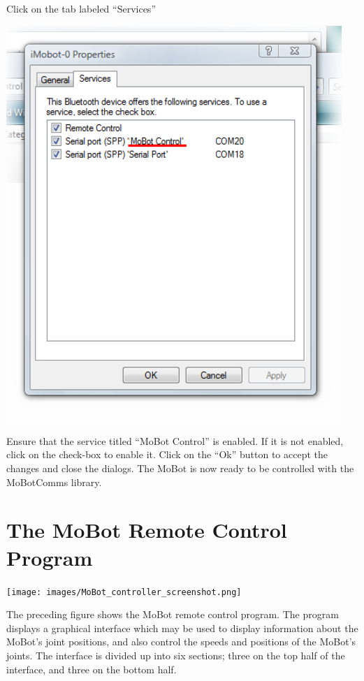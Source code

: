 \documentclass{article}
\begin{document}
Click on the tab labeled ``Services''

\begin{center}
\includegraphics[width=5in]{images/imobot_connect_8.png}
\end{center}

Ensure that the service titled ``MoBot Control'' is enabled. If it is not
enabled, click on the check-box to enable it. Click on the ``Ok'' button to
accept the changes and close the dialogs. The MoBot is now ready to be
controlled with the MoBotComms library.

\section{ The MoBot Remote Control Program }
\texttt{[image: images/MoBot\_controller\_screenshot.png]}

The preceding figure shows the MoBot remote control program. The
program displays a graphical interface which may be used to display
information about the MoBot's joint positions, and also control the
speeds and positions of the MoBot's joints. The interface is divided
up into six sections; three on the top half of the interface, and three on 
the bottom half. 
\end{document}
